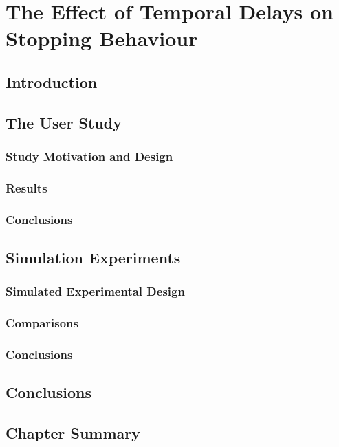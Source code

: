 
\chapter{The Effect of Temporal Delays on Stopping Behaviour}
\section{Introduction}

\section{The User Study}
\subsection{Study Motivation and Design}
\subsection{Results}
\subsection{Conclusions}

\section{Simulation Experiments}
\subsection{Simulated Experimental Design}
\subsection{Comparisons}
\subsection{Conclusions}

\section{Conclusions}
\section{Chapter Summary}